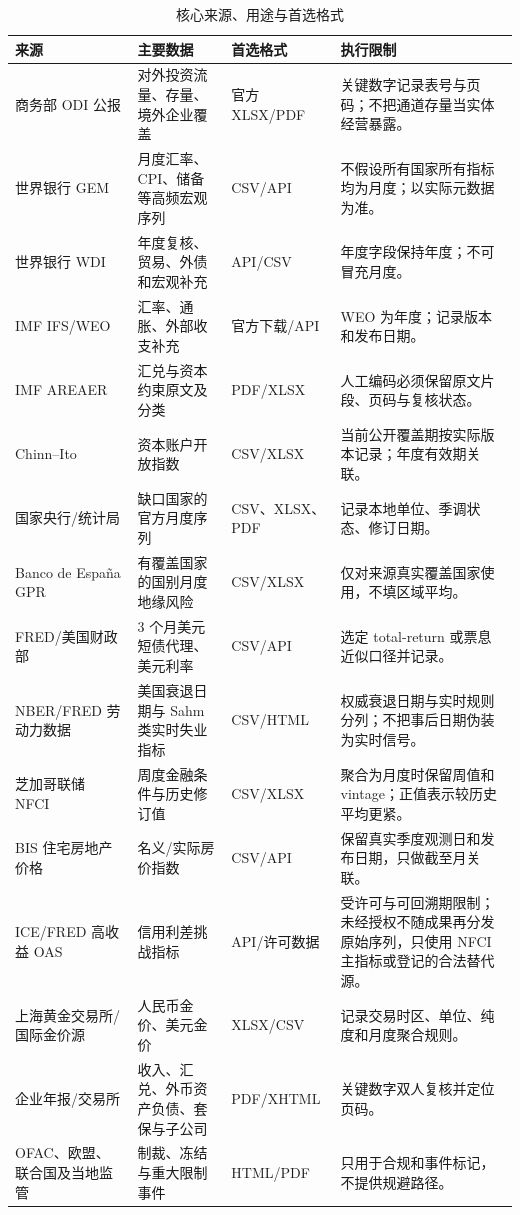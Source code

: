 \documentclass[UTF8,fontset=windows,12pt,openany]{ctexbook}
\begin{document}
\begin{longtable}{p{3.0cm}p{3.2cm}p{3.0cm}p{3.9cm}}
\caption{核心来源、用途与首选格式}\label{tab:source-map}\\
\toprule
\textbf{来源} & \textbf{主要数据} & \textbf{首选格式} & \textbf{执行限制}\\
\midrule
商务部 ODI 公报 & 对外投资流量、存量、境外企业覆盖 & 官方 XLSX/PDF & 关键数字记录表号与页码；不把通道存量当实体经营暴露。\\
世界银行 GEM & 月度汇率、CPI、储备等高频宏观序列 & CSV/API & 不假设所有国家所有指标均为月度；以实际元数据为准。\\
世界银行 WDI & 年度复核、贸易、外债和宏观补充 & API/CSV & 年度字段保持年度；不可冒充月度。\\
IMF IFS/WEO & 汇率、通胀、外部收支补充 & 官方下载/API & WEO 为年度；记录版本和发布日期。\\
IMF AREAER & 汇兑与资本约束原文及分类 & PDF/XLSX & 人工编码必须保留原文片段、页码与复核状态。\\
Chinn--Ito & 资本账户开放指数 & CSV/XLSX & 当前公开覆盖期按实际版本记录；年度有效期关联。\\
国家央行/统计局 & 缺口国家的官方月度序列 & CSV、XLSX、PDF & 记录本地单位、季调状态、修订日期。\\
Banco de España GPR & 有覆盖国家的国别月度地缘风险 & CSV/XLSX & 仅对来源真实覆盖国家使用，不填区域平均。\\
FRED/美国财政部 & 3 个月美元短债代理、美元利率 & CSV/API & 选定 total-return 或票息近似口径并记录。\\
NBER/FRED 劳动力数据 & 美国衰退日期与 Sahm 类实时失业指标 & CSV/HTML & 权威衰退日期与实时规则分列；不把事后日期伪装为实时信号\cite{nberdating,nberchronology,sahmfred}。\\
芝加哥联储 NFCI & 周度金融条件与历史修订值 & CSV/XLSX & 聚合为月度时保留周值和 vintage；正值表示较历史平均更紧\cite{nfciofficial,nfcifred}。\\
BIS 住宅房地产价格 & 名义/实际房价指数 & CSV/API & 保留真实季度观测日和发布日期，只做截至月关联\cite{bisproperty,bispropertydoc}。\\
ICE/FRED 高收益 OAS & 信用利差挑战指标 & API/许可数据 & 受许可与可回溯期限制；未经授权不随成果再分发原始序列，只使用 NFCI 主指标或登记的合法替代源\cite{fredhyoas}。\\
上海黄金交易所/国际金价源 & 人民币金价、美元金价 & XLSX/CSV & 记录交易时区、单位、纯度和月度聚合规则。\\
企业年报/交易所 & 收入、汇兑、外币资产负债、套保与子公司 & PDF/XHTML & 关键数字双人复核并定位页码。\\
OFAC、欧盟、联合国及当地监管 & 制裁、冻结与重大限制事件 & HTML/PDF & 只用于合规和事件标记，不提供规避路径。\\
\bottomrule
\end{longtable}
\end{document}
